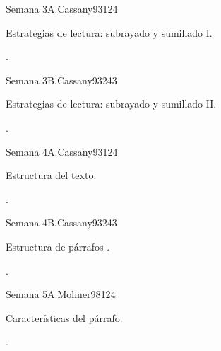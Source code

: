 \begin{syllabus}
\begin{unit}{}{Semana 3A.}{Cassany93}{12}{4}
   \begin{topics}
      \item Estrategias de lectura: subrayado y sumillado I.
   \end{topics}
   \begin{learningoutcomes}
      \item .
   \end{learningoutcomes}
\end{unit}

\begin{unit}{}{Semana 3B.}{Cassany93}{24}{3}
   \begin{topics}
      \item Estrategias de lectura: subrayado y sumillado II.
   \end{topics}

   \begin{learningoutcomes}
      \item .
      \end{learningoutcomes}
\end{unit}

\begin{unit}{}{Semana 4A.}{Cassany93}{12}{4}
   \begin{topics}
      \item Estructura del texto.
   \end{topics}
   \begin{learningoutcomes}
      \item .
   \end{learningoutcomes}
\end{unit}

\begin{unit}{}{Semana 4B.}{Cassany93}{24}{3}
   \begin{topics}
      \item Estructura de párrafos .
   \end{topics}

   \begin{learningoutcomes}
      \item .
      \end{learningoutcomes}
\end{unit}

\begin{unit}{}{Semana 5A.}{Moliner98}{12}{4}
   \begin{topics}
      \item Características del párrafo.
   \end{topics}
   \begin{learningoutcomes}
      \item . 
   \end{learningoutcomes}
\end{unit}


\end{syllabus}
